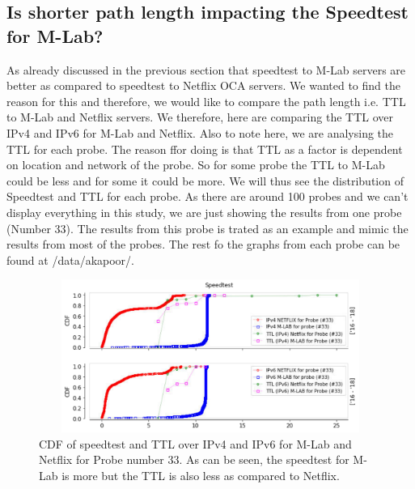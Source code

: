 \subsection*{Is shorter path length impacting the Speedtest for M-Lab?}

As already discussed in the previous section that speedtest to M-Lab servers are better as compared to speedtest to Netflix OCA servers. We wanted to find the reason for this and therefore,
we would like to compare the path length i.e. TTL to M-Lab and Netflix servers. We therefore, here are comparing the TTL over IPv4 and IPv6 for M-Lab and Netflix. Also to note here, we are analysing the TTL
for each probe. The reason ffor doing is that TTL as a factor is dependent on location and network of the probe. So for some probe the TTL to M-Lab could be less and for some it could be more.
We will thus see the distribution of Speedtest and TTL for each probe. As there are around 100 probes and we can't display everything in this study, we are just showing the results from one probe (Number 33).
The results from this probe is trated as an example and mimic the results from most of the probes. The rest fo the graphs from each probe can be found at /data/akapoor/.

 \begin{figure}[!ht]
	\centering
	\includegraphics[keepaspectratio, height=5cm, width=15cm]{figures/mlab/ttl-speedtest-cdf-probe-separate-probe-33.pdf}
	\caption[Speedtest CDF Absolute for Probe 33]{CDF of speedtest and TTL over IPv4 and IPv6 for M-Lab and Netflix for Probe number 33. As can be seen, the speedtest for M-Lab is more but the TTL is also less as compared to Netflix.}
	\label{fig:Speedtest CDF Absolute for Probe 33}
\end{figure}

